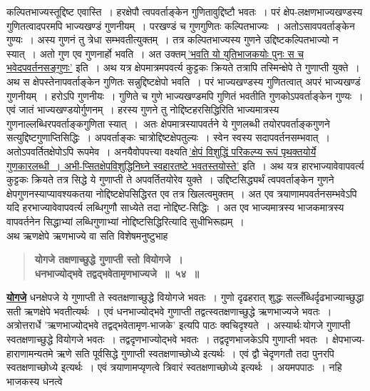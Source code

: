 \documentclass[11pt, openany]{book}
\begin{document}
\newpage

\begin{sloppypar}
\noindent कल्पितभाज्यस्तूद्दिष्ट एवास्ति~। हरक्षेपौ त्वपवर्ताङ्केन गुणितावुद्दिष्टौ भवतः~। परं क्षेप-लक्षणभाज्यखण्डस्य गुणितत्वादपरमपि भाज्यखण्डं गुणनीयम्~। परखण्डं च गुणगुणितः कल्पितभाज्यः~। अतोऽसावपवर्ताङ्केन गुण्यः~। अस्य गुणनं तु त्रेधा सम्भवतीत्युक्तम्~। तत्र कल्पितभाज्यस्य गुणने उद्दिष्टकल्पितभाज्यो न स्यात्~। अतो गुण एव गुणनार्हो भवति~। अत उक्तम्\textendash \,\hyperref[5.53]{'भवति यो युतिभाजकयोः पुनः स च भवेदपवर्तनसङ्गुणः'} इति~। अथ यत्र क्षेपमात्रमपवर्त्य कुट्टकः क्रियते तत्रापि तस्मिन्क्षेपे ते गुणाप्ती युक्ते~। अथ स क्षेपस्तेनापवर्ताङ्केन गुणितः सन्नुद्दिष्टक्षेपो भवति~। परं भाज्यखण्डस्य गुणितत्वात् अपरं भाज्यखण्डं गुणनीयम्~। हरोऽपि गुणनीयः~। गुणिते च गुणे भाज्यखण्डमपि गुणितं भवतीति गुणकोऽपवर्ताङ्केन गुण्यः~। एवं जातं भाज्यखण्डयोर्गुणनम्~। हरस्य गुणने तु नोद्दिष्टहरसिद्धिरिति भाज्यमात्रस्य गुणनाल्लब्धिरपवर्ताङ्कगुणिता स्यात्~।~अतः क्षेपमात्रस्यापवर्तने ये गुणलब्धी तयोरपवर्ताङ्कगुणने सत्युद्दिष्टगुणाप्तिसिद्धिः~। अपवर्ताङ्कः चात्रोद्दिष्टक्षेपतुल्यः~। स्वेन स्वस्य सदापवर्तनसम्भवात्~। अतोऽपवर्तितक्षेपोऽपि रूपमेव~। अनयैवोपपत्त्या वक्ष्यति\textendash \,\hyperref[5.66]{'क्षेपं विशुद्धिं परिकल्प्य रूपं पृथक्तयोर्ये गुणकारलब्धी~। अभी-प्सितक्षेपविशुद्धिनिघ्ने स्वहारतष्टे भवतस्तयोस्ते'} इति~। अथ यत्र हारभाज्यावेवापवर्त्य कुट्टकः क्रियते तत्र सिद्धे ये गुणाप्ती ते अपवर्तितयोरेव युक्ते~। उद्दिष्टसिद्ध्यर्थं त्वपवर्ताङ्केन गुणने क्षेपगुणनस्याप्यावश्यकतया नोद्दिष्टक्षेपसिद्धिरत एव तत्र खिलत्वमुक्तम्~। अत एव त्रयाणामपवर्तनसम्भवेऽपि यदि हरभाज्यावेवापवर्त्य लब्धिगुणौ साध्येते तदा नोद्दिष्ट-सिद्धिः~। अत एव भाज्यमात्रस्य भाजकमात्रस्य वापवर्तनेन सिद्धाभ्यां लब्धिगुणाभ्यां नोद्दिष्टसिद्धिरित्यादि सुधीभिरूह्यम्~। \\

{\small अथ ऋणक्षेपे ऋणभाज्ये वा सति विशेषमनुष्टुभाह\textendash }

 \label{5.54}
\begin{quote}
{\large \textbf{{\color{purple}योगजे तक्षणाच्छुद्धे गुणाप्ती स्तो वियोगजे~।\\
धनभाज्योद्भवे तद्वद्भवेतामृणभाज्यजे~॥~५४~॥}}}
\end{quote}

\hyperref[5.54]{\textbf{योगजे}} धनक्षेपजे ये गुणाप्ती ते स्वतक्षणाच्छुद्धे वियोगजे भवतः~। गुणो दृढहरात् शुद्धः सल्लँब्धिर्दृढभाज्याच्छुद्धा सती ऋणक्षेपे भवतीत्यर्थः~। एवं धनभाज्योद्भवे गुणाप्ती तद्वत्स्वतक्षणाच्छुद्धे ऋणभाज्यजे भवतः~। अत्रोत्तरार्धे 'ऋणभाज्योद्भवे तद्वद्भवेतामृण-भाजके' इत्यपि पाठः क्वचिदृश्यते~। अस्यार्थः\textendash \,योगजे गुणाप्ती स्वतक्षणाच्छुद्धे वियोगजे भवतः~। तद्वदृणभाज्योद्भवे भवतः~। तद्वदृणभाजकेऽपि गुणाप्ती भवतः~। क्षेपभाज्य-हाराणामन्यतमे ऋणे सति पूर्वसिद्धे गुणाप्ती स्वतक्षणाच्छोध्ये इत्यर्थः~। एवं द्वौ चेदृणगतौ तदा पुनरपि स्वतक्षणाच्छोध्ये इत्यर्थः~। एवं त्रयाणामप्यृणत्वे त्रिवारं स्वतक्षणाच्छोध्ये इत्यर्थः~। अयमपपाठः~। नहि भाजकस्य धनत्वे
\end{sloppypar}
\end{document}
